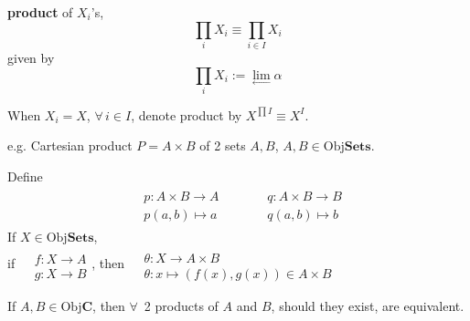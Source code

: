 \begin{definition}
	\textbf{product} of $X_i$'s, 
	\[ 
	\prod_i X_i \equiv \prod_{i\in I} X_i
	\]
	given by 
	\begin{equation}
	\prod_i X_i := \lim_{ \longleftarrow } \alpha 
	\end{equation}
	
	When $X_i = X$, $\forall \, i \in I$, denote product by $X^{ \prod I} \equiv X^I$.  	
\end{definition}

e.g. Cartesian product $P= A\times B$ of 2 sets $A,B$, $A,B \in \text{Obj}\textbf{Sets}$.  

Define 	
\[
\begin{gathered}
\begin{aligned}
& p:A\times B \to A \\
& p(a,b) \mapsto a 
\end{aligned} \qquad \, 
\begin{aligned}
& q:A\times B \to B \\
& q(a,b) \mapsto b 
\end{aligned}
\end{gathered}
\]
If $X \in \text{Obj}\textbf{Sets}$,  \\
if 
$	\begin{aligned} & \quad \\ 
& f: X \to A \\
& g : X  \to B 
\end{aligned}
$, then $\begin{aligned} & \quad \\ 
& \theta: X \to A\times B \\
& \theta : x \mapsto (f(x),g(x)) \in A\times B
\end{aligned}
$

\begin{proposition}
	If $A,B \in \text{Obj}\mathbf{C}$, then $\forall \, $ 2 products of $A$ and $B$, should they exist, are equivalent. 
\end{proposition}

